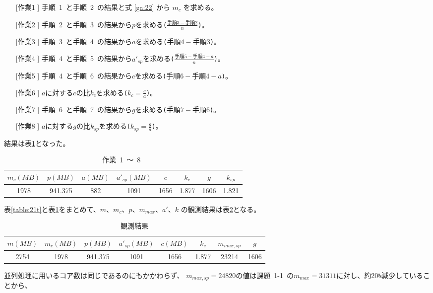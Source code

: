 \documentclass[10pt]{jarticle}
\begin{document}
\begin{itemize}[left=30pt]
\item[[作業1]] 手順\ 1\ と手順\ 2\ の結果と式 \ref{ga:22} から $m_{c}$ を求める。
\item[[作業2]] 手順\ 2\ と手順\ 3\ の結果から$ p $を求める\verb|(|$\frac{手順 3 - 手順 2}{n}$\verb|)|。
\item[[作業3]] 手順\ 3\ と手順\ 4\ の結果から$ a $を求める\verb|(|$手順 4 - 手順 3$\verb|)|。
\item[[作業4]] 手順\ 4\ と手順\ 5\ の結果から$ a'_{sp} $を求める\verb|(|$\frac{手順 5 - 手順 4 - a}{n}$\verb|)|。
\item[[作業5]] 手順\ 4\ と手順\ 6\ の結果から$ c $を求める\verb|(|$手順 6 - 手順 4 - a$\verb|)|。
\item[[作業6]] $ a $に対する$ c $の比$ k_{c} $を求める\verb|(|$k_{c}=\frac{c}{a}$\verb|)|。
\item[[作業7]] 手順\ 6\ と手順\ 7\ の結果から$ g $を求める\verb|(|$手順 7 - 手順 6$\verb|)|。
\item[[作業8]] $ a $に対する$ g $の比$ k_{sp} $を求める\verb|(|$k_{sp}=\frac{g}{a}$\verb|)|。
\end{itemize}
結果は表\ref{table:21s}となった。
\begin{table}[htbp]
	\centering
	\caption{作業\ 1\ ～\ 8\ }
	\label{table:21s}
	\begin{tabular}{|c|c|c|c|c|c|c|c|}
		\hline
		$m_{c}(MB)$ & $p(MB)$ & $a(MB)$ & $a'_{sp}(MB)$ & $c$ & $k_{c}$ & $g$ & $k_{sp}$ \\
		\hline
		1978 & 941.375 & 882 & 1091 & 1656 & 1.877 & 1606 & 1.821 \\
		\hline
	\end{tabular}
\end{table}
表\ref{table:21t}と表\ref{table:21s}をまとめて、$m、 m_{c}、p、m_{max}、a'、k$ の観測結果は表\ref{table:21}となる。
\begin{table}[htbp]
	\centering
	\caption{観測結果}
	\label{table:21}
	\begin{tabular}{|c|c|c|c|c|c|c|c|}
		\hline
		$m(MB)$ & $m_c(MB)$ & $p(MB)$ & $a'_{sp}(MB)$ & $c(MB)$ & $k_{c}$ & $m_{max,sp}$ & $g$\\
		\hline
		2754 & 1978 & 941.375 & 1091 & 1656 & 1.877 & 23214 & 1606 \\
		\hline
	\end{tabular}
\end{table}
並列処理に用いるコア数は同じであるのにもかかわらず、
$m_{max,sp}=24820$の値は課題\ 1-1\ の$m_{max}=31311$に対し、約20\verb|%|減少していることから、
\end{document}

